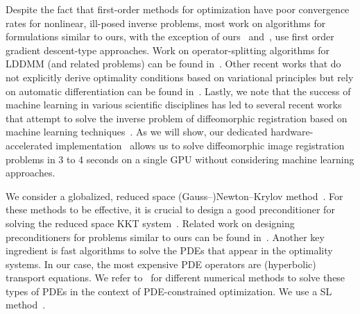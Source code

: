 \documentclass[11pt]{amsart}
\begin{document}
Despite the fact that first-order methods for optimization have poor convergence rates for nonlinear, ill-posed inverse problems, most work on algorithms for formulations similar to ours, with the exception of ours~\cite{Mang:2015a,Mang:2016a,Mang:2018a,Mang:2016b,Mang:2017a,Mang:2017b} and~\cite{Ashburner:2011a,Benzi:2011a,Hernandez:2014a,Simoncini:2012a,Vercauteren:2009a,Herzog:2019a,Polzin:2016a}, use first order gradient descent-type approaches. Work on operator-splitting algorithms for LDDMM (and related problems) can be found in~\cite{Thorley:2021a,Lee:2016a,Zhang:2021a,Mang:2023a}. Other recent works that do not explicitly derive optimality conditions based on variational principles but rely on automatic differentiation can be found in~\cite{Hsieh:2021a,Franccois:2021a,Bone:2018a,Hartman:2023a,Bone:2020a}. Lastly, we note that the success of machine learning in various scientific disciplines has led to several recent works that attempt to solve the inverse problem of diffeomorphic registration based on machine learning techniques~\cite{Shen:2021a,Bone:2020a,Tian:2022a,Amor:2021a,Krebs:2019a,Sun:2022a,Yang:2017a,Wu:2023a,Bharati:2022a,Wu:2022a}. As we will show, our dedicated hardware-accelerated implementation~\cite{Brunn:2020a,Brunn:2021a} allows us to solve diffeomorphic image registration problems in 3 to 4 seconds on a single GPU without considering machine learning approaches.

We consider a globalized, reduced space (Gauss--)Newton--Krylov method~\cite{Mang:2015a,Mang:2019a}. For these methods to be effective, it is crucial to design a good preconditioner for solving the reduced space KKT system~\cite{Benzi:2005a}. Related work on designing preconditioners for problems similar to ours can be found in~\cite{Benzi:2011a,Simoncini:2012a,Herzog:2019a}. Another key ingredient is fast algorithms to solve the PDEs that appear in the optimality systems. In our case, the most expensive PDE operators are (hyperbolic) transport equations. We refer to~\cite{Borzi:2002a,Polzin:2016a,Hart:2009a,Benzi:2011a,Simoncini:2012a,Beg:2005a,Chen:2011a,Mang:2017a} for different numerical methods to solve these types of PDEs in the context of PDE-constrained optimization. We use a SL method~\cite{Beg:2005a,Chen:2011a,Mang:2017b,Mang:2016b}.
\end{document}
